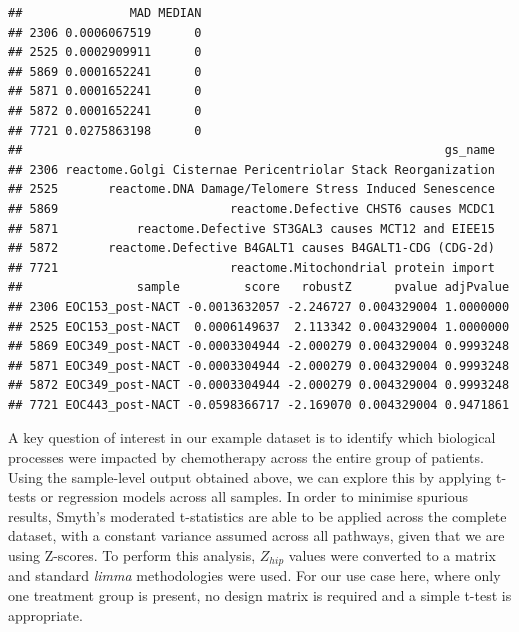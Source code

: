 \documentclass[9pt,a4paper,]{extarticle}
\begin{document}
\begin{verbatim}
##               MAD MEDIAN
## 2306 0.0006067519      0
## 2525 0.0002909911      0
## 5869 0.0001652241      0
## 5871 0.0001652241      0
## 5872 0.0001652241      0
## 7721 0.0275863198      0
##                                                           gs_name
## 2306 reactome.Golgi Cisternae Pericentriolar Stack Reorganization
## 2525       reactome.DNA Damage/Telomere Stress Induced Senescence
## 5869                        reactome.Defective CHST6 causes MCDC1
## 5871           reactome.Defective ST3GAL3 causes MCT12 and EIEE15
## 5872       reactome.Defective B4GALT1 causes B4GALT1-CDG (CDG-2d)
## 7721                        reactome.Mitochondrial protein import
##                sample         score   robustZ      pvalue adjPvalue
## 2306 EOC153_post-NACT -0.0013632057 -2.246727 0.004329004 1.0000000
## 2525 EOC153_post-NACT  0.0006149637  2.113342 0.004329004 1.0000000
## 5869 EOC349_post-NACT -0.0003304944 -2.000279 0.004329004 0.9993248
## 5871 EOC349_post-NACT -0.0003304944 -2.000279 0.004329004 0.9993248
## 5872 EOC349_post-NACT -0.0003304944 -2.000279 0.004329004 0.9993248
## 7721 EOC443_post-NACT -0.0598366717 -2.169070 0.004329004 0.9471861
\end{verbatim}

A key question of interest in our example dataset is to identify which biological processes were impacted by chemotherapy across the entire group of patients.
Using the sample-level output obtained above, we can explore this by applying t-tests or regression models across all samples.
In order to minimise spurious results, Smyth's moderated t-statistics\citep{Smyth_2004} are able to be applied across the complete dataset, with a constant variance assumed across all pathways, given that we are using Z-scores.
To perform this analysis, \(Z_{hip}\) values were converted to a matrix and standard \emph{limma} methodologies were used.
For our use case here, where only one treatment group is present, no design matrix is required and a simple t-test is appropriate.
\end{document}
